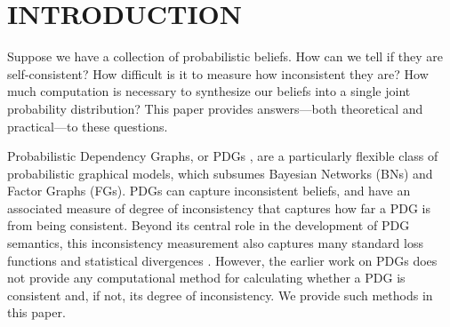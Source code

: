\documentclass[twoside]{article}
\begin{document}



\section{INTRODUCTION}

Suppose we have a collection of probabilistic beliefs. 
How can we tell if they are self-consistent?
How difficult is it to measure how inconsistent they are?
How much computation is necessary to synthesize our beliefs into a single joint probability distribution?
This paper provides answers---both
theoretical and practical---to these questions. 


Probabilistic Dependency Graphs, or PDGs \parencite{pdg-aaai},
are a particularly flexible class of probabilistic graphical models, which subsumes Bayesian Networks (BNs) 
and Factor Graphs (FGs). 
PDGs can capture inconsistent beliefs, and have an associated measure
of degree of inconsistency that captures how far a PDG is from being
consistent.  
%
Beyond its central role in the development of PDG semantics,
this inconsistency measurement also captures many standard
loss functions and statistical divergences
 \parencite{one-true-loss}.
However, the earlier work on PDGs does not provide any
computational method for calculating whether a PDG is consistent and,
if not, its degree of inconsistency.  We provide such methods in this paper.
\end{document}
